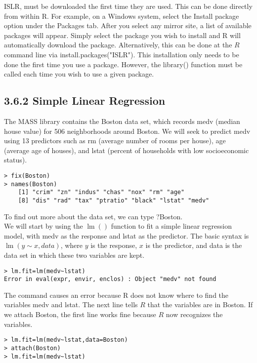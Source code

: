 \documentclass[10pt]{article}
\begin{document}

ISLR, must be downloaded the first time they are used. This can be done directly from within R. For example, on a Windows system, select the Install package option under the Packages tab. After you select any mirror site, a list of available packages will appear. Simply select the package you wish to install and R will automatically download the package. Alternatively, this can be done at the $R$ command line via install.packages("ISLR"). This installation only needs to be done the first time you use a package. However, the library() function must be called each time you wish to use a given package.

\subsection*{3.6.2 Simple Linear Regression}
The MASS library contains the Boston data set, which records medv (median house value) for 506 neighborhoods around Boston. We will seek to predict medv using 13 predictors such as rm (average number of rooms per house), age (average age of houses), and lstat (percent of households with low socioeconomic status).

\begin{verbatim}
> fix(Boston)
> names(Boston)
    [1] "crim" "zn" "indus" "chas" "nox" "rm" "age"
    [8] "dis" "rad" "tax" "ptratio" "black" "lstat" "medv"
\end{verbatim}

To find out more about the data set, we can type ?Boston.\\
We will start by using the $\operatorname{lm}()$ function to fit a simple linear regression model, with medv as the response and lstat as the predictor. The basic syntax is $\operatorname{lm}(y \sim x, d a t a)$, where $y$ is the response, $x$ is the predictor, and data is the data set in which these two variables are kept.

\begin{verbatim}
> lm.fit=lm(medv~lstat)
Error in eval(expr, envir, enclos) : Object "medv" not found
\end{verbatim}

The command causes an error because R does not know where to find the variables medv and lstat. The next line tells $R$ that the variables are in Boston. If we attach Boston, the first line works fine because $R$ now recognizes the variables.

\begin{verbatim}
> lm.fit=lm(medv~lstat,data=Boston)
> attach(Boston)
> lm.fit=lm(medv~lstat)
\end{verbatim}
\end{document}
